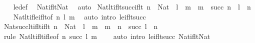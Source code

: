 \begin{isabellebody}
%
\isadelimproof
\ \ %
\endisadelimproof
%
\isatagproof
{}\isamarkupfalse%
\ le{\isacharunderscore}{\kern0pt}def\ \isamarkupfalse%
\ Nat{\isacharunderscore}{\kern0pt}if{\isacharunderscore}{\kern0pt}lt{\isacharunderscore}{\kern0pt}Nat\ \isamarkupfalse%
\ auto%
\endisatagproof
{\isafoldproof}%
%
\isadelimproof
\isanewline
%
\endisadelimproof
\isanewline
{}\isamarkupfalse%
\ Nat{\isacharunderscore}{\kern0pt}lt{\isacharunderscore}{\kern0pt}if{\isacharunderscore}{\kern0pt}lt{\isacharunderscore}{\kern0pt}succ{\isacharunderscore}{\kern0pt}if{\isacharunderscore}{\kern0pt}lt{\isacharcolon}{\kern0pt}\ {\isachardoublequoteopen}n\ {\isacharcolon}{\kern0pt}\ Nat\ {\isasymLongrightarrow}\ l\ {\isacharless}{\kern0pt}\ m\ {\isasymLongrightarrow}\ m\ {\isacharless}{\kern0pt}\ succ\ n\ {\isasymLongrightarrow}\ l\ {\isacharless}{\kern0pt}\ n{\isachardoublequoteclose}\isanewline
%
\isadelimproof
\ \ %
\endisadelimproof
%
\isatagproof
{}\isamarkupfalse%
\ Nat{\isacharunderscore}{\kern0pt}lt{\isacharunderscore}{\kern0pt}if{\isacharunderscore}{\kern0pt}le{\isacharunderscore}{\kern0pt}if{\isacharunderscore}{\kern0pt}lt{\isacharbrackleft}{\kern0pt}of\ n\ l\ m{\isacharbrackright}{\kern0pt}\ \isamarkupfalse%
\ {\isacharparenleft}{\kern0pt}auto\ intro{\isacharcolon}{\kern0pt}\ le{\isacharunderscore}{\kern0pt}if{\isacharunderscore}{\kern0pt}lt{\isacharunderscore}{\kern0pt}succ{\isacharparenright}{\kern0pt}%
\endisatagproof
{\isafoldproof}%
%
\isadelimproof
\isanewline
%
\endisadelimproof
\isanewline
{}\isamarkupfalse%
\ Nat{\isacharunderscore}{\kern0pt}succ{\isacharunderscore}{\kern0pt}lt{\isacharunderscore}{\kern0pt}if{\isacharunderscore}{\kern0pt}lt{\isacharunderscore}{\kern0pt}if{\isacharunderscore}{\kern0pt}lt{\isacharcolon}{\kern0pt}\ {\isachardoublequoteopen}n\ {\isacharcolon}{\kern0pt}\ Nat\ {\isasymLongrightarrow}\ l\ {\isacharless}{\kern0pt}\ m\ {\isasymLongrightarrow}\ m\ {\isacharless}{\kern0pt}\ n\ {\isasymLongrightarrow}\ succ\ l\ {\isacharless}{\kern0pt}\ n{\isachardoublequoteclose}\isanewline
%
\isadelimproof
\ \ %
\endisadelimproof
%
\isatagproof
{}\isamarkupfalse%
\ {\isacharparenleft}{\kern0pt}rule\ Nat{\isacharunderscore}{\kern0pt}lt{\isacharunderscore}{\kern0pt}if{\isacharunderscore}{\kern0pt}lt{\isacharunderscore}{\kern0pt}if{\isacharunderscore}{\kern0pt}le{\isacharbrackleft}{\kern0pt}of\ n\ {\isachardoublequoteopen}succ\ l{\isachardoublequoteclose}\ m{\isacharbrackright}{\kern0pt}{\isacharparenright}{\kern0pt}\isanewline
\ \ \ \ {\isacharparenleft}{\kern0pt}auto\ intro{\isacharcolon}{\kern0pt}\ le{\isacharunderscore}{\kern0pt}if{\isacharunderscore}{\kern0pt}lt{\isacharunderscore}{\kern0pt}succ\ Nat{\isacharunderscore}{\kern0pt}if{\isacharunderscore}{\kern0pt}lt{\isacharunderscore}{\kern0pt}Nat{\isacharparenright}{\kern0pt}%

\end{isabellebody}
